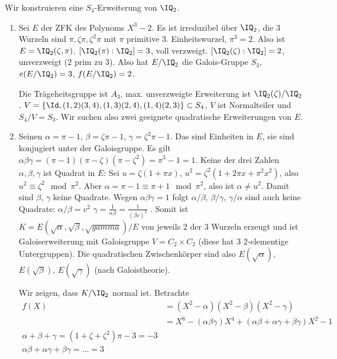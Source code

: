 \renewcommand{\lecdate}{11.02.2015}

\begin{Beispiel}
 Wir konstruieren eine $S_4$-Erweiterung von $\IQ_2$.
 \begin{enumerate}[1)]
  \item Sei $E$ der ZFK des Polynoms $X^3-2$. Es ist irreduzibel über $\IQ_2$, die $3$ Wurzeln sind $\pi,\zeta\pi,\zeta^2\pi$ mit $\pi$ primitive 3. Einheitswurzel, $\pi^3=2$.
  Also ist $E=\IQ_2(\zeta,\pi)$. $[\IQ_2(\pi):\IQ_2]=3$, voll verzweigt. $[\IQ_2(\zeta):\IQ_2]=2$, unverzweigt ($2$ prim zu $3$). Also hat $E/\IQ_2$ die Galois-Gruppe $S_3$, $e(E/\IQ_2)=3$, $f(E/\IQ_2)=2$.
  
  Die Trägeheitsgruppe ist $A_3$, max. unverzweigte Erweiterung ist $\IQ_2(\zeta)/\IQ_2$. $V=\{ \Id, (1,2)(3,4), (1,3)(2,4), (1,4)(2,3)\}\subset S_4$, $V$ ist Normalteiler und $S_4/V=S_3$. Wir suchen also zwei geeignete quadratische Erweiterungen von $E$.
  \item Seinen $\alpha=\pi-1$, $\beta=\zeta\pi-1$, $\gamma=\zeta^2\pi-1$. Das sind Einheiten in $E$, sie sind konjugiert unter der Galoisgruppe. Es gilt $\alpha\beta\gamma=(\pi-1)(\pi-\zeta)(\pi-\zeta^2)=\pi^3-1=1$.
  Keine der drei Zahlen $\alpha,\beta,\gamma$ ist Quadrat in $E$:
  Sei $u=\zeta(1+\pi x)$, $u^2=\zeta^2(1+2\pi x+ \pi^2 x^2)$, also $u^2\equiv \zeta^2\mod{\pi^2}$. Aber $\alpha=\pi-1\equiv \pi+1 \mod{\pi^2}$, also ist $\alpha\neq u^2$. Damit sind $\beta$, $\gamma$ keine Quadrate. Wegen $\alpha\beta\gamma=1$ folgt $\alpha/\beta$, $\beta/\gamma$, $\gamma/\alpha$ sind auch keine Quadrate: $\alpha/\beta=v^2$ \folge $\gamma=\frac{1}{\alpha\beta}=\frac{1}{(\beta v)^2}$ \lightning.
  Somit ist $K=E(\sqrt{\alpha}, \sqrt{\beta}, \sqrt{gamma})/E$ von jeweils $2$ der $3$ Wurzeln erzeugt und ist Galoiserweiterung mit Galoisgruppe $V=C_2\times C_2$ (diese hat $3$ 2-elementige Untergruppen). Die quadratischen Zwischenkörper sind also $E(\sqrt \alpha)$, $E(\sqrt\beta)$, $E(\sqrt\gamma)$ (nach Galoistheorie).
  
  Wir zeigen, dass $K/\IQ_2$ normal ist. Betrachte 
  \begin{align*}
   f(X)&=(X^2-\alpha)(X^2-\beta)(X^2-\gamma)\\
   &=X^6-(\alpha\beta\gamma)X^4+(\alpha\beta+\alpha\gamma+\beta\gamma)X^2-1\\
  \alpha+\beta+\gamma= (1+\zeta+\zeta^2)\pi-3=-3\\
  \alpha\beta+\alpha\gamma+\beta\gamma=\ldots=3
  \end{align*}
  

\end{enumerate}
\end{Beispiel}
